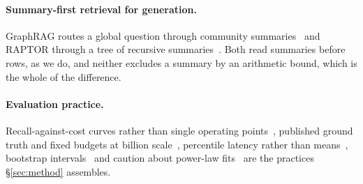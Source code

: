 \paragraph{Summary-first retrieval for generation.}
GraphRAG routes a global question through community
summaries~\cite{edge2024graphrag} and RAPTOR through a tree of recursive
summaries~\cite{sarthi2024raptor}. Both read summaries before rows, as we do,
and neither excludes a summary by an arithmetic bound, which is the whole of
the difference.

\paragraph{Evaluation practice.}
Recall-against-cost curves rather than single operating
points~\cite{aumuller2020annb}, published ground truth and fixed budgets at
billion scale~\cite{simhadri2022bigann}, percentile latency rather than
means~\cite{dean2013tail}, bootstrap intervals~\cite{efron1993bootstrap} and
caution about power-law fits~\cite{clauset2009powerlaw} are the practices
\S\ref{sec:method} assembles.

